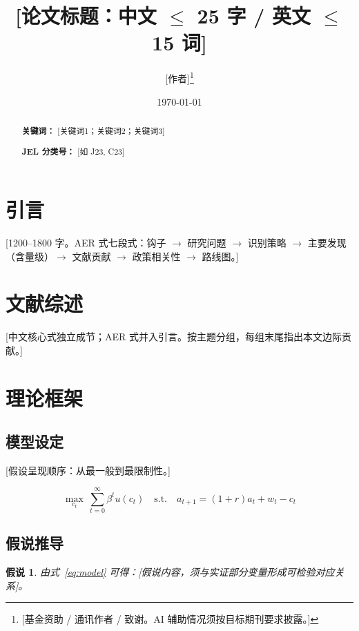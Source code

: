\documentclass[11pt,a4paper]{article}
\title{[论文标题：中文 $\le$ 25 字 / 英文 $\le$ 15 词]}
\author{[作者]\thanks{[基金资助 / 通讯作者 / 致谢。AI 辅助情况须按目标期刊要求披露。]}}
\date{\today}
\numberwithin{equation}{section}
\theoremstyle{plain}
\newtheorem{hyp}{假说}
\begin{document}
\maketitle

\begin{abstract}

\par\smallskip
\noindent\textbf{关键词：} [关键词1；关键词2；关键词3]

\par\smallskip
\noindent\textbf{JEL 分类号：} [如 J23, C23]
\end{abstract}

\section{引言}
[1200--1800 字。AER 式七段式：钩子 $\rightarrow$ 研究问题 $\rightarrow$ 识别策略 $\rightarrow$ 主要发现（含量级）$\rightarrow$ 文献贡献 $\rightarrow$ 政策相关性 $\rightarrow$ 路线图。]

\section{文献综述}
[中文核心式独立成节；AER 式并入引言。按主题分组，每组末尾指出本文边际贡献。]

\section{理论框架}
\subsection{模型设定}
[假设呈现顺序：从最一般到最限制性。]

\begin{equation}\label{eq:model}
\max_{c_t}\ \sum_{t=0}^{\infty}\beta^{t}u(c_t)
\quad \text{s.t.} \quad
a_{t+1}=(1+r)a_t+w_t-c_t
\end{equation}

\subsection{假说推导}
\begin{hyp}\label{hyp:h1}
由式~\eqref{eq:model} 可得：[假说内容，须与实证部分变量形成可检验对应关系]。
\end{hyp}
\end{document}
